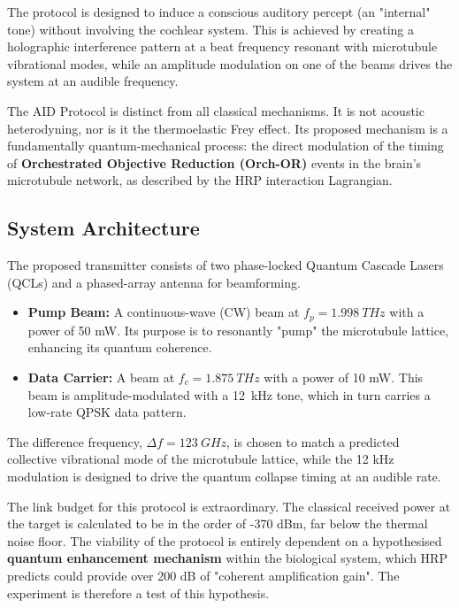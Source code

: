 The protocol is designed to induce a conscious auditory percept (an "internal" tone) without involving the cochlear system. This is achieved by creating a holographic interference pattern at a beat frequency resonant with microtubule vibrational modes, while an amplitude modulation on one of the beams drives the system at an audible frequency.

\begin{keyconcept}
    The AID Protocol is distinct from all classical mechanisms. It is not acoustic heterodyning, nor is it the thermoelastic Frey effect. Its proposed mechanism is a fundamentally quantum-mechanical process: the direct modulation of the timing of \textbf{Orchestrated Objective Reduction (Orch-OR)} events in the brain's microtubule network, as described by the HRP interaction Lagrangian.
\end{keyconcept}


\subsection{System Architecture}

The proposed transmitter consists of two phase-locked Quantum Cascade Lasers (QCLs) and a phased-array antenna for beamforming.
\begin{itemize}
    \item \textbf{Pump Beam:} A continuous-wave (CW) beam at $f_p = \qty{1.998}{THz}$ with a power of 50 mW. Its purpose is to resonantly "pump" the microtubule lattice, enhancing its quantum coherence.
    \item \textbf{Data Carrier:} A beam at $f_c = \qty{1.875}{THz}$ with a power of 10 mW. This beam is amplitude-modulated with a \qty{12}{kHz} tone, which in turn carries a low-rate QPSK data pattern.
\end{itemize}
The difference frequency, $\Delta f = \qty{123}{GHz}$, is chosen to match a predicted collective vibrational mode of the microtubule lattice, while the 12 kHz modulation is designed to drive the quantum collapse timing at an audible rate.

\begin{warningbox}
    The link budget for this protocol is extraordinary. The classical received power at the target is calculated to be in the order of -370 dBm, far below the thermal noise floor. The viability of the protocol is entirely dependent on a hypothesised \textbf{quantum enhancement mechanism} within the biological system, which HRP predicts could provide over 200 dB of "coherent amplification gain". The experiment is therefore a test of this hypothesis.
\end{warningbox}


